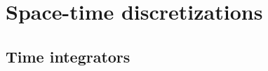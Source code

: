 \documentclass[a4paper,12pt]{article}
\begin{document}
\allowdisplaybreaks


\section{Space-time discretizations}\label{sec:disc}

\subsection{Time integrators}
\end{document}
